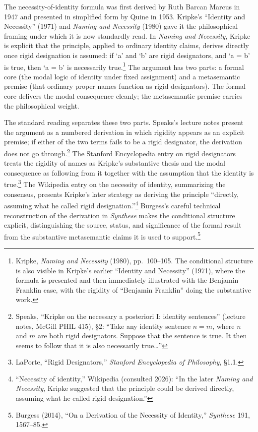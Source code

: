 \documentclass[10pt]{article}
\begin{document}
The necessity-of-identity formula was first derived by Ruth Barcan Marcus in 1947 and presented in simplified form by Quine in 1953. Kripke's ``Identity and Necessity'' (1971) and \emph{Naming and Necessity} (1980) gave it the philosophical framing under which it is now standardly read. In \emph{Naming and Necessity}, Kripke is explicit that the principle, applied to ordinary identity claims, derives directly once rigid designation is assumed: if `a' and `b' are rigid designators, and `a = b' is true, then `a = b' is necessarily true.\footnote{Kripke, \emph{Naming and Necessity} (1980), pp.~100--105. The conditional structure is also visible in Kripke's earlier ``Identity and Necessity'' (1971), where the formula is presented and then immediately illustrated with the Benjamin Franklin case, with the rigidity of ``Benjamin Franklin'' doing the substantive work.} The argument has two parts: a formal core (the modal logic of identity under fixed assignment) and a metasemantic premise (that ordinary proper names function as rigid designators). The formal core delivers the modal consequence cleanly; the metasemantic premise carries the philosophical weight.

The standard reading separates these two parts. Speaks's lecture notes present the argument as a numbered derivation in which rigidity appears as an explicit premise; if either of the two terms fails to be a rigid designator, the derivation does not go through.\footnote{Speaks, ``Kripke on the necessary a posteriori I: identity sentences'' (lecture notes, McGill PHIL 415), §2: ``Take any identity sentence \(n=m\), where \(n\) and \(m\) are both rigid designators. Suppose that the sentence is true. It then seems to follow that it is also necessarily true\ldots{}''} The Stanford Encyclopedia entry on rigid designators treats the rigidity of names as Kripke's substantive thesis and the modal consequence as following from it together with the assumption that the identity is true.\footnote{LaPorte, ``Rigid Designators,'' \emph{Stanford Encyclopedia of Philosophy}, §1.1.} The Wikipedia entry on the necessity of identity, summarizing the consensus, presents Kripke's later strategy as deriving the principle ``directly, assuming what he called rigid designation.''\footnote{``Necessity of identity,'' Wikipedia (consulted 2026): ``In the later \emph{Naming and Necessity}, Kripke suggested that the principle could be derived directly, assuming what he called rigid designation.''} Burgess's careful technical reconstruction of the derivation in \emph{Synthese} makes the conditional structure explicit, distinguishing the source, status, and significance of the formal result from the substantive metasemantic claims it is used to support.\footnote{Burgess (2014), ``On a Derivation of the Necessity of Identity,'' \emph{Synthese} 191, 1567--85.}
\end{document}
